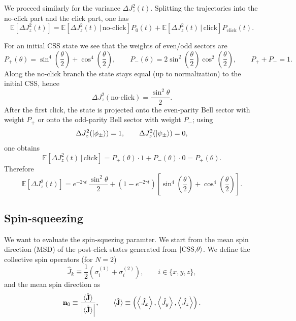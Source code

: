 We proceed similarly for the variance $\Delta J_z^2(t)$.
Splitting the trajectories into the no-click part and the click part, one has
\begin{equation}
	\mathbb{E}\!\left[\Delta J_z^2(t)\right]
	=
	\mathbb{E}\!\left[\Delta J_z^2(t)\,\big|\,\text{no-click}\right]P_0(t)
	+
	\mathbb{E}\!\left[\Delta J_z^2(t)\,\big|\,\text{click}\right]P_{\mathrm{click}}(t).
\end{equation}

For an initial CSS state we see that the weights of even/odd sectors are
\begin{equation}
	P_{+}(\theta)=\sin^{4}\!\left(\frac{\theta}{2}\right)
	+
	\cos^{4}\!\left(\frac{\theta}{2}\right),
	\qquad
	P_{-}(\theta)=	2\sin^{2}\!\left(\frac{\theta}{2}\right)
	\cos^{2}\!\left(\frac{\theta}{2}\right),
	\qquad
	P_{+}+P_{-}=1.
\end{equation}
Along the no-click branch the state stays equal (up to normalization) to the initial CSS, hence
\begin{equation}
	\Delta J_z^2(\text{no-click})
	=
	\frac{\sin^{2}\theta}{2}.
\end{equation}
After the first click, the state is projected onto the even-parity Bell sector with weight $P_{+}$
or onto the odd-parity Bell sector with weight $P_{-}$; using
\begin{equation}
	\Delta J_z^2(\ket{\phi_\pm})=1,
	\qquad
	\Delta J_z^2(\ket{\psi_\pm})=0,
\end{equation}
one obtains
\begin{equation}
	\mathbb{E}\!\left[\Delta J_z^2(t)\,\big|\,\text{click}\right]
	=
	P_{+}(\theta)\cdot 1 + P_{-}(\theta)\cdot 0
	=
	P_{+}(\theta).
\end{equation}
Therefore
\begin{equation}
		\mathbb{E}\!\left[\Delta J_z^2(t)\right]
		=
		e^{-2\gamma t}\,\frac{\sin^{2}\theta}{2}
		+
		\left(1-e^{-2\gamma t}\right)\left[\sin^{4}\!\left(\frac{\theta}{2}\right)
		+
		\cos^{4}\!\left(\frac{\theta}{2}\right)\right].
\end{equation}

\subsection{Spin-squeezing}

We want to evaluate the spin-squezing paramter. We start from the mean spin direction (MSD) of the post-click states generated from
\(\ket{\mathrm{CSS,}\theta}\). We define the collective spin operators (for \(N=2\))
\begin{equation}
	\hat J_k \equiv \frac{1}{2}\left(\sigma_i^{(1)}+\sigma_i^{(2)}\right),
	\qquad
	i\in\{x,y,z\},
\end{equation}
and the mean spin direction as
\begin{equation}
	\mathbf{n}_0
	\equiv
	\frac{\langle \hat{\mathbf{J}} \rangle}{\left|\langle \hat{\mathbf{J}} \rangle\right|},
	\qquad
	\langle \hat{\mathbf{J}} \rangle
	\equiv
	\left(\expval{\hat J_x},\expval{\hat J_y},\expval{\hat J_z}\right).
	\label{eq:MSD_def}
\end{equation}

